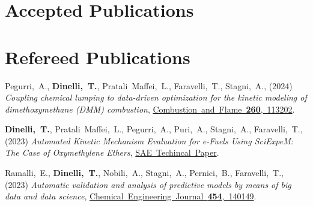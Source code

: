 \ifshowacceptedpubs
\section{\sc Accepted Publications}
\else %
\fi

\section{\sc Refereed Publications}
   \addtocounter{pubCounter}{-1}
   \begin{etaremune}[start=\value{pubCounter}]
      \item
         Pegurri,~A.,
         {\bf Dinelli,~T.},
         Pratali~Maffei,~L.,
         Faravelli,~T.,
         Stagni,~A.,
         (2024)
         {\it Coupling chemical lumping to data-driven optimization for the kinetic modeling of dimethoxymethane (DMM) combustion},
         \href{https://doi.org/10.1016/j.combustflame.2023.113202}
         {Combustion~and~Flame~{\bf 260},~113202}.

      \item
         {\bf Dinelli,~T.},
         Pratali~Maffei,~L.,
         Pegurri,~A.,
         Puri,~A.,
         Stagni,~A.,
         Faravelli,~T.,
         (2023)
         {\it Automated Kinetic Mechanism Evaluation for e-Fuels Using SciExpeM: The Case of Oxymethylene Ethers},
         \href{https://doi.org/10.4271/2023-24-0092}
         {SAE~Techincal~Paper}.

      \item
         Ramalli,~E.,
         {\bf Dinelli,~T.},
         Nobili,~A.,
         Stagni,~A.,
         Pernici,~B.,
         Faravelli,~T.,
         (2023)
         {\it Automatic validation and analysis of predictive models by means of big data and data science},
         \href{https://doi.org/10.1016/j.cej.2022.140149}
         {Chemical~Engineering~Journal~{\bf 454},~140149}.
      \setcounter{pubCounter}{\value{enumi}}
   \end{etaremune}
